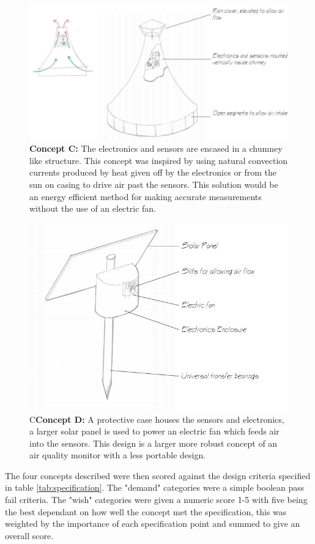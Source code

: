 \begin{figure}[H]
\centering
\includegraphics[width=0.6\linewidth]{Engineering_hardware/Engineering_hardware_Figures/Concept_chimney.JPG}
\caption{\textbf{Concept C:} The electronics and sensors are encased in a chumney like structure. This concept was inspired by using natural convection currents produced by heat given off by the electronics or from the sun on casing to drive air past the sensors. This solution would be an energy efficient method for making accurate measurements without the use of an electric fan.}
\label{fig:15cm_shell_loading}
\end{figure}


\begin{figure}[H]
\centering
\includegraphics[width=0.6\linewidth]{Engineering_hardware/Engineering_hardware_Figures/Concept_stake.JPG}
\caption{C\textbf{Concept D:} A protective case houses the sensors and electronics, a larger solar panel is used to power an electric fan which feeds air into the sensors. This design is a larger more robust concept of an air quality monitor with a less portable design.}
\label{fig:15cm_shell_loading}
\end{figure}

The four concepts described were then scored against the design criteria specified in table \ref{tab:specification}. The "demand" categories were a simple boolean pass fail criteria. The "wish" categories were given a numeric score 1-5 with five being the best dependant on how well the concept met the specification, this was weighted by the importance of each specification point and summed to give an overall score.

